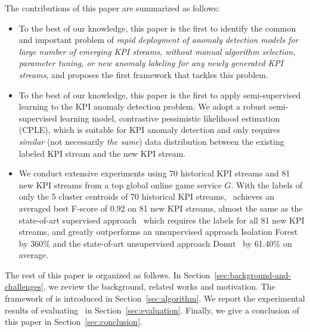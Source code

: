 The contributions of this paper are summarized as follows:
\begin{itemize}
	\item To the best of our knowledge, this paper is the first to identify the common and important problem of \textit{rapid deployment of anomaly detection models for large number of emerging KPI streams, without manual algorithm selection, parameter tuning, or new anomaly labeling for any newly generated KPI streams}, and proposes the first framework \name{} that tackles this problem. 
	
	\item To the best of our knowledge, this paper is the first to apply semi-supervised learning to the KPI anomaly detection problem. We adopt a robust semi-supervised learning model, contrastive pessimistic likelihood estimation (CPLE), which is suitable for KPI anomaly detection and only requires \textit{similar} (not necessarily \textit{the same}) data distribution between the existing labeled KPI stream and the new KPI stream. 
	
	\item We conduct extensive experiments using 70 historical KPI streams and 81 new KPI streams from a top global online game service $G$. With the labels of only the 5 cluster centroids of 70 historical KPI streams, \name~achieves an averaged best F-score of 0.92 on 81 new KPI streams, almost the same as the state-of-art supervised approach~\cite{liu2015opprentice} which requires the labels for all 81 new KPI streams, and greatly outperforms an unsupervised approach Isolation Forest~\cite{zhang2018anomaly} by 360\% and the state-of-art unsupervised approach Donut~\cite{xu2018unsupervised} by 61.40\% on average. 
\end{itemize}

The rest of this paper is organized as follows. 
In Section~\ref{sec:background-and-challenges}, we review the background, related works and motivation.
The framework of \name{} is introduced in Section~\ref{sec:algorithm}.
We report the experimental results of evaluating~\name{} in Section~\ref{sec:evaluation}. Finally, we give a conclusion of this paper in Section~\ref{sec:conclusion}.